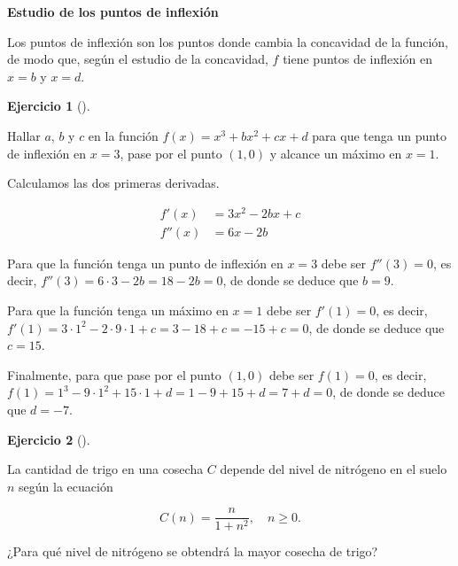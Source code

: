 \documentclass[
  spanish,
  a4paper,
]{scrreport}
\theoremstyle{definition}
\newtheorem{exercise}{Ejercicio}[chapter]
\theoremstyle{remark}
\begin{document}
\begin{tcolorbox}
\textbf{Estudio de los puntos de inflexión}

Los puntos de inflexión son los puntos donde cambia la concavidad de la
función, de modo que, según el estudio de la concavidad, \(f\) tiene
puntos de inflexión en \(x=b\) y \(x=d\).

\end{tcolorbox}

\begin{exercise}[]\protect\hypertarget{exr-extremos-2}{}\label{exr-extremos-2}

Hallar \(a\), \(b\) y \(c\) en la función \(f(x)=x^3+bx^2+cx+d\) para
que tenga un punto de inflexión en \(x=3\), pase por el punto \((1,0)\)
y alcance un máximo en \(x=1\).

\end{exercise}

\begin{tcolorbox}[enhanced jigsaw, arc=.35mm, bottomrule=.15mm, bottomtitle=1mm, breakable, colback=white, colbacktitle=quarto-callout-tip-color!10!white, colframe=quarto-callout-tip-color-frame, coltitle=black, left=2mm, leftrule=.75mm, opacityback=0, opacitybacktitle=0.6, rightrule=.15mm, title=\textcolor{quarto-callout-tip-color}{\faLightbulb}\hspace{0.5em}{Solución}, titlerule=0mm, toprule=.15mm, toptitle=1mm]

Calculamos las dos primeras derivadas.

\begin{align*}
f'(x) &= 3x^2-2bx+c\\ 
f''(x) &= 6x-2b
\end{align*}

Para que la función tenga un punto de inflexión en \(x=3\) debe ser
\(f''(3)=0\), es decir, \(f''(3) = 6\cdot 3 - 2b = 18-2b = 0\), de donde
se deduce que \(b=9\).

Para que la función tenga un máximo en \(x=1\) debe ser \(f'(1)=0\), es
decir, \(f'(1)=3\cdot 1^2-2\cdot 9\cdot 1+c = 3-18+c = -15+c=0\), de
donde se deduce que \(c=15\).

Finalmente, para que pase por el punto \((1,0)\) debe ser \(f(1)=0\), es
decir, \(f(1) = 1^3-9\cdot 1^2+15\cdot 1+d = 1-9+15+d = 7+d=0\), de
donde se deduce que \(d=-7\).

\end{tcolorbox}

\begin{exercise}[]\protect\hypertarget{exr-extremos-3}{}\label{exr-extremos-3}

La cantidad de trigo en una cosecha \(C\) depende del nivel de nitrógeno
en el suelo \(n\) según la ecuación

\[
C(n) = \frac{n}{1+n^2},\quad n\geq 0.
\]

¿Para qué nivel de nitrógeno se obtendrá la mayor cosecha de trigo?

\end{exercise}
\end{document}
